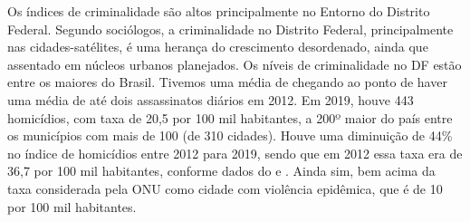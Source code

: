 Os índices de criminalidade são altos principalmente no Entorno do Distrito Federal. Segundo sociólogos, a criminalidade no Distrito Federal, principalmente nas cidades-satélites, é uma herança do crescimento desordenado, ainda que assentado em núcleos urbanos planejados. Os níveis de criminalidade no DF estão entre os maiores do Brasil. Tivemos uma média de chegando ao ponto de haver uma média de até dois assassinatos diários em 2012. Em 2019, houve 443 homicídios, com taxa de 20,5 por 100 mil habitantes, a 200º maior do país entre os municípios com mais de 100 (de 310 cidades). Houve uma diminuição de 44\% no índice de homicídios entre 2012 para 2019, sendo que em 2012 essa taxa era de 36,7 por 100 mil habitantes, conforme dados do  e . Ainda sim, bem acima da taxa considerada pela ONU como cidade com violência epidêmica, que é de 10 por 100 mil habitantes.\\


